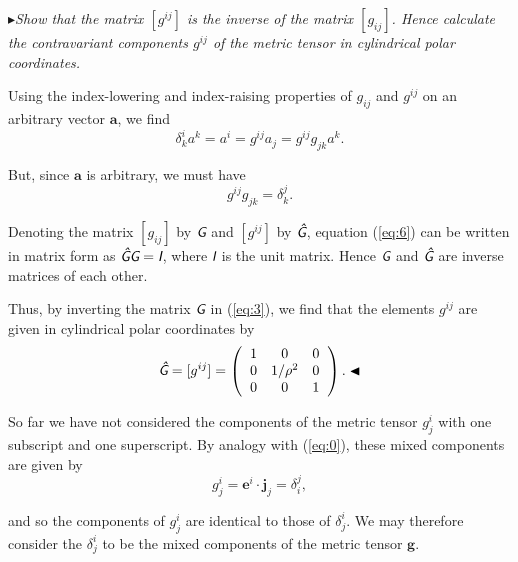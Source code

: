 \documentclass[9pt, twoside]{extbook}
\newcommand{\textbox}[1]{
	\begin{tcolorbox}[
			colback=boxGray,
			colframe=black,
			arc=0pt,
			top=0pt,
			right=0pt,
			bottom=0pt,
			left=0pt,
			boxrule=0.2pt
		]
		\small$\blacktriangleright$\textit{#1}
	\end{tcolorbox}
}
\newcommand{\latinmodern}[1]{\textsf{\itshape #1}}
\begin{document}
\vspace{2mm}

\textbox{Show that the matrix $[g^{ij}]$ is the inverse of the matrix $[g_{ij}]$. Hence calculate the contravariant components $g^{ij}$ of the metric tensor in cylindrical polar coordinates.}

\vspace{1mm}

\noindent \small Using the index-lowering and index-raising properties of $g_{ij}$ and $g^{ij}$ on an arbitrary vector \linebreak $\boldsymbol{a}$, we find
\begin{equation*}
	\delta^i_ka^k = a^i = g^{ij}a_j =g^{ij}g_{jk}a^k.
\end{equation*}

\noindent But, since $\boldsymbol{a}$ is arbitrary, we must have
\begin{equation}
	\label{eq:6}
	g^{ij}g_{jk} = \delta^{j}_{k}.
\end{equation}

Denoting the matrix $[g_{ij}]$ by $\latinmodern{G}$ and $[g^{ij}]$ by $\latinmodern{\^G}$, equation (\ref{eq:6}) can be written in matrix form as $\latinmodern{\^GG} = \latinmodern{I}$, where $\latinmodern{I}$ is the unit matrix. Hence $\latinmodern{G}$ and $\latinmodern{\^G}$ are inverse matrices of each \linebreak other.

\pagebreak

Thus, by inverting the matrix $\latinmodern{G}$ in (\ref{eq:3}), we find that the elements $g^{ij}$ are given in cylindrical polar coordinates by
\begin{equation*}
	\latinmodern{\^G} = [g^{ij}] =
	\begin{pmatrix}
		\hspace{2mm} 1 & 0        & 0 \hspace{2mm} \\
		\hspace{2mm} 0 & 1/\rho^2 & 0 \hspace{2mm} \\
		\hspace{2mm} 0 & 0        & 1 \hspace{2mm}
	\end{pmatrix}. \blacktriangleleft
\end{equation*}

\normalsize So far we have not considered the components of the metric tensor $g^{i}_{j}$ with one subscript and one superscript. By analogy with (\ref{eq:0}), these mixed components are given by
\begin{equation*}
	g^{i}_{j} = \boldsymbol{e}^{i} \cdot \boldsymbol{j}_{j} = \delta^{j}_{i},
\end{equation*}

\noindent and so the components of $g^{i}_{j}$ are identical to those of $\delta^{i}_{j}$. We may therefore consider the $\delta^{i}_{j}$ to be the mixed components of the metric tensor $\boldsymbol{g}$.
\end{document}
